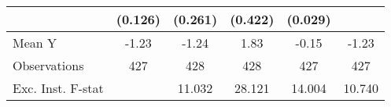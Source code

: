 {\begin{tabular}{l*{5}{c}}
            &     (0.126)         &     (0.261)         &     (0.422)         &     (0.029)         &                     \\
\midrule
Mean Y      &       -1.23         &       -1.24         &        1.83         &       -0.15         &       -1.23         \\
Observations&         427         &         428         &         428         &         427         &         427         \\
Exc. Inst. F-stat&                     &      11.032         &      28.121         &      14.004         &      10.740         \\
\bottomrule
\end{tabular}
}
